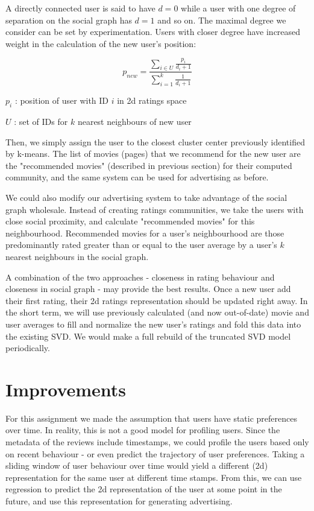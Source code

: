 \documentclass[11pt]{article}
\begin{document}
A directly connected user is said to have $d = 0$ while a user with one degree of separation on the social graph has $d = 1$ and so on. The maximal degree we consider can be set by experimentation. Users with closer degree have increased weight in the calculation of the new user's position:

\[
    p_{new} = \frac{\sum_{i\in U}\frac{p_{i}}{d_{i}+1}}{\sum_{i=1}^{k}\frac{1}{d_{i}+1}}
\]

$p_{i}$ : position of user with ID $i$ in 2d ratings space

$U$ : set of IDs for $k$ nearest neighbours of new user\newline

Then, we simply assign the user to the closest cluster center previously identified by k-means. The list of movies (pages) that we recommend for the new user are the "recommended movies" (described in previous section) for their computed community, and the same system can be used for advertising as before.\newline

We could also modify our advertising system to take advantage of the social graph wholesale. Instead of creating ratings communities, we take the users with close social proximity, and calculate "recommended movies" for this neighbourhood. Recommended movies for a user's neighbourhood are those predominantly rated greater than or equal to the user average by a user's $k$ nearest neighbours in the social graph.\newline

A combination of the two approaches - closeness in rating behaviour and closeness in social graph - may provide the best results. Once a new user add their first rating, their 2d ratings representation should be updated right away. In the short term, we will use previously calculated (and now out-of-date) movie and user averages to fill and normalize the new user's ratings and fold this data into the existing SVD. We would make a full rebuild of the truncated SVD model periodically.


\section{Improvements}

For this assignment we made the assumption that users have static preferences over time. In reality, this is not a good model for profiling users. Since the metadata of the reviews include timestamps, we could profile the users based only on recent behaviour - or even predict the trajectory of user preferences. Taking a sliding window of user behaviour over time would yield a different (2d) representation for the same user at different time stamps. From this, we can use regression to predict the 2d representation of the user at some point in the future, and use this representation for generating advertising.\newline
\end{document}
